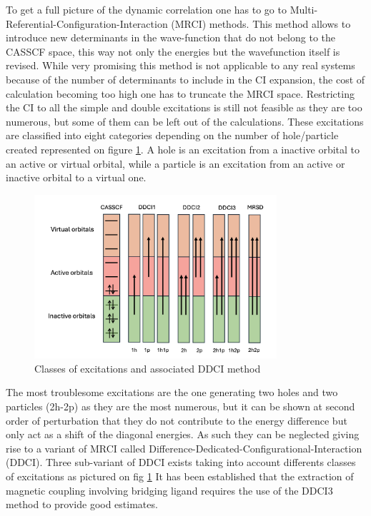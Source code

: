 \documentclass[10pt]{report}
\numberwithin{equation}{section}
\begin{document}
To get a full picture of the dynamic correlation one has to go to Multi-Referential-Configuration-Interaction (MRCI) methods.
This method allows to introduce new determinants in the wave-function that do not belong to the CASSCF space, this way not only the energies but the wavefunction itself is revised.
While very promising this method is not applicable to any real systems because of the number of determinants to include in the CI expansion, the cost of calculation becoming too high one has to truncate the MRCI space.
Restricting the CI to all the simple and double excitations is still not feasible as they are too numerous, but some of them can be left out of the calculations. 
These excitations are classified into eight categories depending on the number of hole/particle created represented on figure \ref{DDCI}. 
A hole is an excitation from a inactive orbital to an active or virtual orbital, while a particle is an excitation from an active or inactive orbital to a virtual one.

\begin{figure}
    \centering
    \includegraphics[width=0.8\textwidth]{Images/DDCI.png}
    \caption{Classes of excitations and associated DDCI method}
    \label{DDCI}
\end{figure}
The most troublesome excitations are the one generating two holes and two particles (2h-2p) as they are the most numerous, but it can be shown at second order of perturbation that they do not contribute to the energy difference but only act as a shift of the diagonal energies.
As such they can be neglected giving rise to a variant of MRCI called Difference-Dedicated-Configurational-Interaction (DDCI). 
Three sub-variant of DDCI exists taking into account differents classes of excitations as pictured on fig \ref{DDCI}
It has been established that the extraction of magnetic coupling involving bridging ligand requires the use of the DDCI3 method to provide good estimates.
\end{document}
